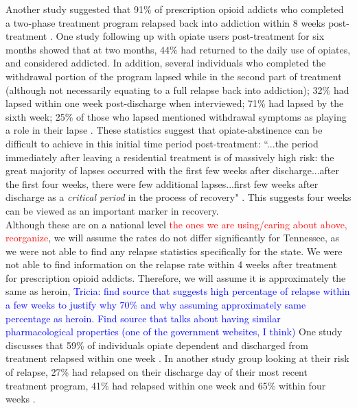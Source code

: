 \documentclass[12pt]{article}
\begin{document}
Another study suggested that 91\% of prescription opioid addicts who completed a two-phase treatment program relapsed back into addiction within 8 weeks post-treatment \cite{Weiss}. One study following up with opiate users post-treatment for six months showed that at two months, 44\% had returned to the daily use of opiates, and considered addicted. In addition, several individuals who completed the withdrawal portion of the program lapsed while in the second part of treatment (although not necessarily equating to a full relapse back into addiction); 32\% had lapsed within one week post-discharge when interviewed; 71\% had lapsed by the sixth week; 25\% of those who lapsed mentioned withdrawal symptoms as playing a role in their lapse \cite{Gossop1, Gossop2}. These statistics suggest that opiate-abstinence can be difficult to achieve in this initial time period post-treatment: ``...the period immediately after leaving a residential treatment is of massively high risk: the great majority of lapses occurred with the first few weeks after discharge...after the first four weeks, there were few additional lapses...first few weeks after discharge as a \textit{critical period} in the process of recovery" \cite{Gossop1}. This suggests four weeks can be viewed as an important marker in recovery. \\


 Although these are on a national level \textcolor{red}{the ones we are using/caring about above, reorganize}, we will assume the rates do not differ significantly for Tennessee, as we were not able to find any relapse statistics specifically for the state. We were not able to find information on the relapse rate within 4 weeks after treatment for prescription opioid addicts. Therefore, we will assume it is approximately the same as heroin, \textcolor{blue}{Tricia: find source that suggests high percentage of relapse within a few weeks to justify why 70\% and why assuming approximately same percentage as heroin. Find source that talks about having similar pharmacological properties (one of the government websites, I think)} One study discusses that 59\% of individuals opiate dependent and discharged from treatment relapsed within one week \cite{Smyth}. In another study group looking at their risk of relapse, 27\% had relapsed on their discharge day of their most recent treatment program, 41\% had relapsed within one week and 65\% within four weeks \cite{Bailey}.
\end{document}
